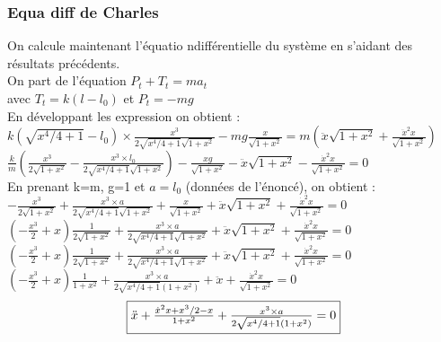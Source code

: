 \documentclass[10pt,a4paper]{article}
\begin{document}
\subsubsection{Equa diff de Charles}
On calcule maintenant l'équatio ndifférentielle du système en s'aidant des résultats précédents.\\
On part de l'équation $ P_t+T_t=ma_t $\\
avec $T_t=k(l-l_0)$ et $P_t=-mg$\\
En développant les expression on obtient :\\
$k(\sqrt{x^4/4+1}-l_0)\times \frac{x^3}{2\sqrt{x^4/4+1}\sqrt{1+x^2}}-mg\frac{x}{\sqrt{1+x^2}}=m(\ddot{x}\sqrt{1+x^2}+\frac{\ddot{x}^2x}{\sqrt{1+x^2}})$\\
$ \frac{k}{m}(\frac{x^3}{2\sqrt{1+x^2}}-\frac{x^3\times l_0}{2\sqrt{x^4/4+1}\sqrt{1+x^2}})-\frac{xg}{\sqrt{1+x^2}}-\ddot{x}\sqrt{1+x^2}-\frac{\dot{x}^2x}{\sqrt{1+x^2}}=0 $\\
En prenant k=m, g=1 et $a=l_0$ (données de l'énoncé), on obtient :\\
$ -\frac{x^3}{2\sqrt{1+x^2}}+\frac{x^3\times a}{2\sqrt{x^4/4+1}\sqrt{1+x^2}}+\frac{x}{\sqrt{1+x^2}}+\ddot{x}\sqrt{1+x^2}+\frac{\dot{x}^2x}{\sqrt{1+x^2}}=0 $\\
$ (-\frac{x^3}{2}+x)\frac{1}{2\sqrt{1+x^2}}+\frac{x^3\times a}{2\sqrt{x^4/4+1}\sqrt{1+x^2}}+\ddot{x}\sqrt{1+x^2}+\frac{\dot{x}^2x}{\sqrt{1+x^2}}=0 $\\
$ (-\frac{x^3}{2}+x)\frac{1}{2\sqrt{1+x^2}}+\frac{x^3\times a}{2\sqrt{x^4/4+1}\sqrt{1+x^2}}+\ddot{x}\sqrt{1+x^2}+\frac{\dot{x}^2x}{\sqrt{1+x^2}}=0 $\\
$ (-\frac{x^3}{2}+x)\frac{1}{1+x^2}+\frac{x^3\times a}{2\sqrt{x^4/4+1}(1+x^2)}+\ddot{x}+\frac{\dot{x}^2x}{\sqrt{1+x^2}}=0 $\\
\[ \fbox{$ \ddot{x}+\frac{\dot{x}^2x+x^3/2-x}{1+x^2}+\frac{x^3\times a}{2\sqrt{x^4/4+1}(1+x^2)}=0 $}\]
\end{document}
